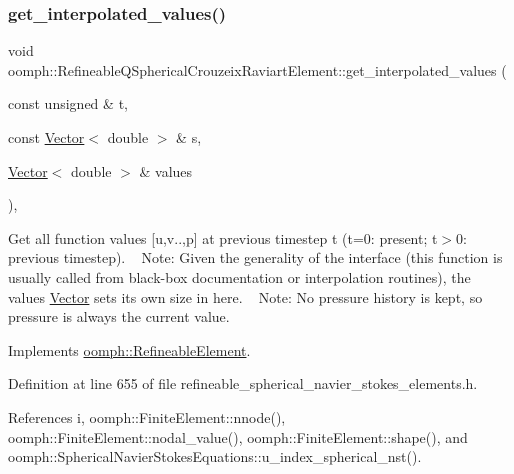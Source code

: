 \subsubsection{\texorpdfstring{get\+\_\+interpolated\+\_\+values()}{get\_interpolated\_values()}\hspace{0.1cm}{\footnotesize\ttfamily [2/2]}}
{\footnotesize\ttfamily void oomph\+::\+Refineable\+Q\+Spherical\+Crouzeix\+Raviart\+Element\+::get\+\_\+interpolated\+\_\+values (\begin{DoxyParamCaption}\item[{const unsigned \&}]{t,  }\item[{const \hyperlink{classoomph_1_1Vector}{Vector}$<$ double $>$ \&}]{s,  }\item[{\hyperlink{classoomph_1_1Vector}{Vector}$<$ double $>$ \&}]{values }\end{DoxyParamCaption})\hspace{0.3cm}{\ttfamily [inline]}, {\ttfamily [virtual]}}



Get all function values \mbox{[}u,v..,p\mbox{]} at previous timestep t (t=0\+: present; t$>$0\+: previous timestep). ~\newline
 Note\+: Given the generality of the interface (this function is usually called from black-\/box documentation or interpolation routines), the values \hyperlink{classoomph_1_1Vector}{Vector} sets its own size in here. ~\newline
Note\+: No pressure history is kept, so pressure is always the current value. 



Implements \hyperlink{classoomph_1_1RefineableElement_ada6f0efe831ffefb1d2829ce01d45bfc}{oomph\+::\+Refineable\+Element}.



Definition at line 655 of file refineable\+\_\+spherical\+\_\+navier\+\_\+stokes\+\_\+elements.\+h.



References i, oomph\+::\+Finite\+Element\+::nnode(), oomph\+::\+Finite\+Element\+::nodal\+\_\+value(), oomph\+::\+Finite\+Element\+::shape(), and oomph\+::\+Spherical\+Navier\+Stokes\+Equations\+::u\+\_\+index\+\_\+spherical\+\_\+nst().

\mbox{\label{classoomph_1_1RefineableQSphericalCrouzeixRaviartElement_ab2d2448ca25da6b58a565a8ca18c5e06}} 

